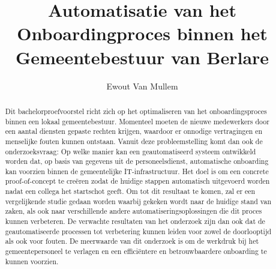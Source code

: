 \documentclass{hogent-article}
\title{Automatisatie van het Onboardingproces binnen het Gemeentebestuur van Berlare}
\author{Ewout Van Mullem}
\begin{document}
\begin{abstract}
  
  Dit bachelorproefvoorstel richt zich op het optimaliseren van het onboardingsproces binnen een lokaal gemeentebestuur. Momenteel moeten de nieuwe medewerkers door een aantal diensten gepaste rechten krijgen, waardoor er onnodige vertragingen en menselijke fouten kunnen ontstaan. Vanuit deze probleemstelling komt dan ook de onderzoeksvraag: Op welke manier kan een geautomatiseerd systeem ontwikkeld worden dat, op basis van gegevens uit de personeelsdienst, automatische onboarding kan voorzien binnen de gemeentelijke IT-infrastructuur. Het doel is om een concrete proof-of-concept te creëren zodat de huidige stappen automatisch uitgevoerd worden nadat een collega het startschot geeft. Om tot dit resultaat te komen, zal er een vergelijkende studie gedaan worden waarbij gekeken wordt naar de huidige stand van zaken, als ook naar verschillende andere automatiseringsoplossingen die dit proces kunnen verbeteren. De verwachte resultaten van het onderzoek zijn dan ook dat de geautomatiseerde processen tot verbetering kunnen leiden voor zowel de doorlooptijd als ook voor fouten. De meerwaarde van dit onderzoek is om de werkdruk bij het gemeentepersoneel te verlagen en een efficiëntere en betrouwbaardere onboarding te kunnen voorzien.
\end{abstract}

\tableofcontents



\printbibliography[heading=bibintoc]
\end{document}
